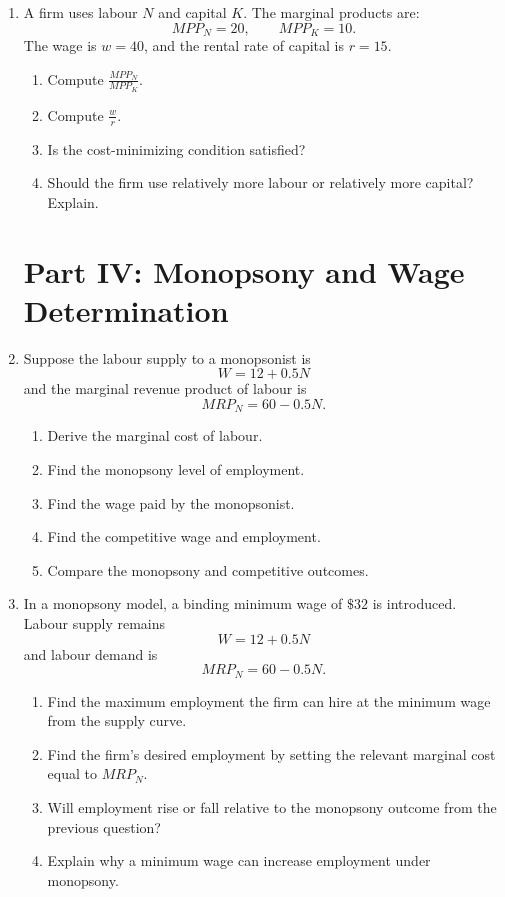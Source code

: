 \documentclass[12pt]{article}
\begin{document}
\begin{enumerate}
\item A firm uses labour \(N\) and capital \(K\). The marginal products are:
\[
MPP_N = 20,\qquad MPP_K = 10.
\]
The wage is \(w=40\), and the rental rate of capital is \(r=15\).

\begin{enumerate}[label=(\alph*)]
    \item Compute \(\frac{MPP_N}{MPP_K}\).
    \item Compute \(\frac{w}{r}\).
    \item Is the cost-minimizing condition satisfied?
    \item Should the firm use relatively more labour or relatively more capital? Explain.
\end{enumerate}

\section*{Part IV: Monopsony and Wage Determination}

\item Suppose the labour supply to a monopsonist is
\[
W = 12 + 0.5N
\]
and the marginal revenue product of labour is
\[
MRP_N = 60 - 0.5N.
\]

\begin{enumerate}[label=(\alph*)]
    \item Derive the marginal cost of labour.
    \item Find the monopsony level of employment.
    \item Find the wage paid by the monopsonist.
    \item Find the competitive wage and employment.
    \item Compare the monopsony and competitive outcomes.
\end{enumerate}

\item In a monopsony model, a binding minimum wage of \(\$32\) is introduced. Labour supply remains
\[
W = 12 + 0.5N
\]
and labour demand is
\[
MRP_N = 60 - 0.5N.
\]

\begin{enumerate}[label=(\alph*)]
    \item Find the maximum employment the firm can hire at the minimum wage from the supply curve.
    \item Find the firm's desired employment by setting the relevant marginal cost equal to \(MRP_N\).
    \item Will employment rise or fall relative to the monopsony outcome from the previous question?
    \item Explain why a minimum wage can increase employment under monopsony.
\end{enumerate}


\end{enumerate}
\end{document}

